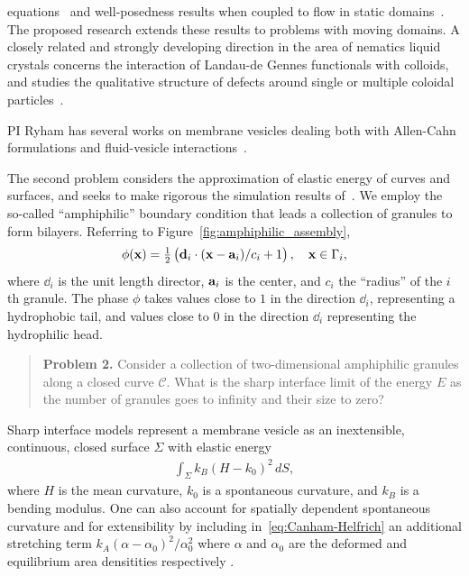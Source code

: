 equations~\cite{Christlieb2019CompetitionAC, Gavish2011CurvatureDF,
Dai2019WeakSF, Promislow2017ExistenceBA, Dai2015CompetitiveGE,
Promislow2012CriticalPO, Dai2022GeometricEO, Dai2020MinimizersFT,
Dai2013GeometricEO, Promislow2022UndulatedBI, Gera2017CahnHilliardOS}
and well-posedness
results when coupled to flow in static domains~\cite{Jiang2017TwophaseIF,
Liu2012StrongSF, Giorgini2019WellPosednessOA, Wu2022WellposednessOA,
Gal2010AsymptoticBO, Giorgini2020DiffuseIM, Giorgini2019UniquenessAR}.
The proposed research extends these results to problems with moving
domains. A closely related and strongly developing direction in the area
of nematics liquid crystals concerns the interaction of Landau-de Gennes
functionals with colloids, and studies the qualitative structure of
defects around single or multiple coloidal
particles~\cite{doi:10.1098/rsta.2020.0432, Alama2015MinimizersOT,
  Alama2021SaturnRD, PhysRevE.96.042702}.

PI Ryham has several works on
membrane vesicles dealing both with Allen-Cahn formulations and
fluid-vesicle interactions~\cite{QiangDu09, RYHAM20112929, RyCoEi12,
Ryham2017OnTV}.

The second problem considers the approximation of elastic energy of
curves and surfaces, and seeks to make rigorous the simulation results
of~\cite{FuQuRyYo22, Fu2018_SIAM}. We employ the so-called
``amphiphilic'' boundary condition that leads a collection of
granules to form bilayers. Referring to
Figure~\ref{fig:amphiphilic_assembly}, 
\begin{align}
\label{eq:amphiphilic_BC}
  \phi(\xx) = \tfrac{1}{2}\left(\dd_i \cdot 
    (\xx - \aa_i)/c_i + 1\right), \quad \xx \in \Gamma_i,
\end{align}
where $\dd_i$ is the unit length director, $\aa_i$ is the center, and
$c_i$ the ``radius'' of the $i$th granule. The phase $\phi$ takes values
close to $1$ in the direction $\dd_i$, representing a hydrophobic tail,
and values close to $0$ in the direction $\dd_i$ representing the
hydrophilic head.

\begin{quotation}
  \noindent
  \textbf{Problem 2.}
  Consider a collection of two-dimensional amphiphilic granules along a
  closed curve $\mathcal{C}$. What is the sharp interface limit of the
  energy $E$ as the number of granules goes to infinity and their size
  to zero?
\end{quotation}

Sharp interface models represent a membrane vesicle as an
inextensible, continuous, closed surface $\Sigma$ with elastic energy
\begin{align}
  \label{eq:Canham-Helfrich}
  \int_{\Sigma} k_B(H - k_0)^2\, dS,
\end{align}
where $H$ is the mean curvature, $k_0$ is a spontaneous curvature, and
$k_B$ is a bending modulus. One can also account
for spatially dependent spontaneous curvature
\cite{PhysRevE.79.031926,Lowengrub13,mahapatra_saintillan_rangamani_2020}
and for extensibility by
including in~\eqref{eq:Canham-Helfrich} an additional stretching term
$k_A(\alpha - \alpha_0)^2/\alpha_0^2$ where $\alpha$ and $\alpha_0$ are
the deformed and equilibrium area densitities respectively
\cite{chabanon2017}.

